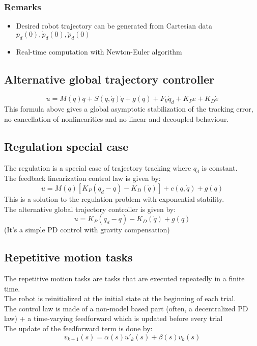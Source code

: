 \documentclass[a4paper,12pt]{article}
\begin{document}
\subsubsection{Remarks}
\begin{itemize}
    \item Desired robot trajectory can be generated from 
    Cartesian data $p_d(0), \dot{p}_d(0), \ddot{p}_d(0)$
    \item Real-time computation with Newton-Euler algorithm
\end{itemize}
\subsection{Alternative global trajectory controller}
\begin{equation}
u = M(q)\ddot{q} + S(q,\dot{q})\dot{q} + g(q) + F_V\dot{q} _d + K_Pe + K_D\dot{e}
\end{equation}
This formula above gives a global asymptotic stabilization of the tracking error,
no cancellation of nonlinearities and no linear and decoupled behaviour.
\subsection{Regulation special case}
The regulation is a special case of trajectory tracking where $q_d$ 
is constant.\\
The feedback linearization control law is given by:
\begin{equation}
    u = M(q)[K_P(q_d-q) - K_D(\dot{q})] + c(q,\dot{q}) + g(q)
\end{equation}
This is a solution to the regulation problem with exponential stability.\\
The alternative global trajectory controller is given by:
\begin{equation}
    u = K_P(q_d-q) - K_D(\dot{q}) + g(q) 
\end{equation}
(It's a simple PD control with gravity compensation)

\subsection{Repetitive motion tasks}
The repetitive motion tasks are tasks that are executed
repeatedly in a finite time.\\
The robot is reinitialized at the initial state at the beginning
of each trial.\\
The control law is made of a non-model based part (often, a
decentralized PD law) + a time-varying feedforward which is
updated before every trial\\
The update of the feedforward term is done by:
\begin{equation}
    v_{k+1}(s) = \alpha (s) u'_k(s) + \beta (s) v_k(s)
\end{equation}
\end{document}
